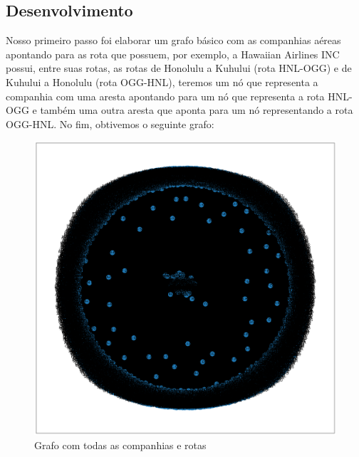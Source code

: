 \documentclass{article}
\begin{document}
\subsection{Desenvolvimento}

Nosso primeiro passo foi elaborar um grafo básico com as companhias aéreas apontando para as rota que possuem, por exemplo, a Hawaiian Airlines INC possui, entre suas rotas, as rotas de Honolulu a Kuhului (rota HNL-OGG) e de Kuhului a Honolulu (rota OGG-HNL), teremos um nó que representa a companhia com uma aresta apontando para um nó que representa a rota HNL-OGG e também uma outra aresta que aponta para um nó representando a rota OGG-HNL. No fim, obtivemos o seguinte grafo:
\begin{figure}
    \centering
    \includegraphics[scale = 0.3]{Imagens/todos.png}
    \caption{Grafo com todas as companhias e rotas}
    \label{grafo}
\end{figure}
\end{document}
